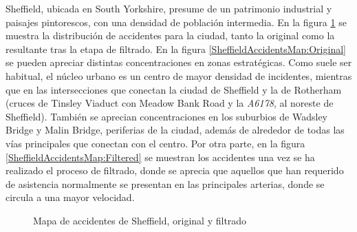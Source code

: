 Sheffield, ubicada en South Yorkshire, presume de un patrimonio industrial y paisajes pintorescos, con una densidad de población intermedia. En la figura \ref{SheffieldAccidentsMap} se muestra la distribución de accidentes para la ciudad, tanto la original como la resultante tras la etapa de filtrado. En la figura \ref{SheffieldAccidentsMap:Original} se pueden apreciar distintas concentraciones en zonas estratégicas. Como suele ser habitual, el núcleo urbano es un centro de mayor densidad de incidentes, mientras que en las intersecciones que conectan la ciudad de Sheffield y la de Rotherham (cruces de Tinsley Viaduct con Meadow Bank Road y la \textit{A6178}, al noreste de Sheffield). También se aprecian concentraciones en los suburbios de Wadsley Bridge y Malin Bridge, periferias de la ciudad, además de alrededor de todas las vías principales que conectan con el centro. Por otra parte, en la figura \ref{SheffieldAccidentsMap:Filtered} se muestran los accidentes una vez se ha realizado el proceso de filtrado, donde se aprecia que aquellos que han requerido de asistencia normalmente se presentan en las principales arterias, donde se circula a una mayor velocidad.


\begin{figure}[H]
	\centering
	\caption{Mapa de accidentes de Sheffield, original y filtrado}
	\label{SheffieldAccidentsMap}
\end{figure}


